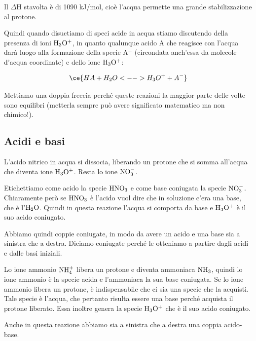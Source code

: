 Il $\Delta$H stavolta è di 1090 kJ/mol, cioè l'acqua permette una grande stabilizzazione al protone.

\vspace{0.2cm}Quindi quando disuctiamo di speci acide in acqua stiamo discutendo della presenza di ioni $\rm H_3O^+$, in quanto qualunque acido A che reagisce con l'acqua darà luogo alla formazione della specie A$^-$ (circondata anch'essa da molecole d'acqua coordinate) e dello ione $\rm H_3O^+$:

$$\ce{HA + H_2O <--> H_3O^+ + A^-}$$

Mettiamo una doppia freccia perché queste reazioni la maggior parte delle volte sono equilibri (metterla sempre può avere significato matematico ma non chimico!).
\subsection{Acidi e basi}

\vspace{0.2cm}

\vspace{0.2cm}L'acido nitrico in acqua si dissocia, liberando un protone che si somma all'acqua che diventa ione $\rm H_3O^+$. Resta lo ione $\rm NO_3^-$.

Etichettiamo come acido la specie $\rm HNO_3$ e come base coniugata la specie $\rm NO_3^-$. Chiaramente però se $\rm HNO_3$ è l'acido vuol dire che in soluzione c'era una base, che è l'$\rm H_2O$. Quindi in questa reazione l'acqua si comporta da base e $\rm H_3O^+$ è il suo acido coniugato.

Abbiamo quindi coppie coniugate, in modo da avere un acido e una base sia a sinistra che a destra. Diciamo coniugate perché le otteniamo a partire dagli acidi e dalle basi iniziali.

\vspace{0.2cm}

\vspace{0.2cm}Lo ione ammonio $\rm NH_4^+$ libera un protone e diventa ammoniaca $\rm NH_3$, quindi lo ione ammonio è la specie acida e l'ammoniaca la sua base coniugata. Se lo ione ammonio libera un protone, è indispensabile che ci sia una specie che la acquisti. Tale specie è l'acqua, che pertanto risulta essere una base perché acquista il protone liberato. Essa inoltre genera la specie $\rm H_3O^+$ che è il suo acido coniugato.

Anche in questa reazione abbiamo sia a sinistra che a destra una coppia acido-base.

